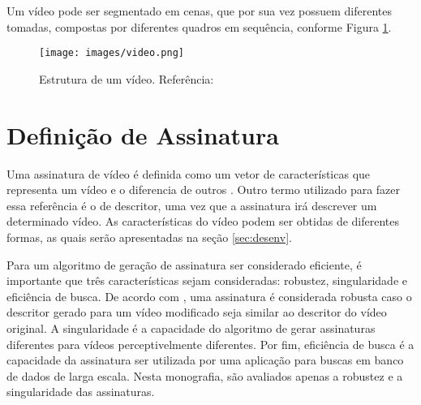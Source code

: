     
    Um vídeo pode ser segmentado em cenas, que por sua vez possuem diferentes tomadas, compostas por diferentes quadros em sequência, conforme Figura \ref{fig:video}. 
    
    
 
    
    \begin{figure}[h]
        \centering
        \texttt{[image: images/video.png]}
        \caption{Estrutura de um vídeo. Referência: \cite{santos2004segmentaccao}}
    	\label{fig:video}
    \end{figure}

  	\section{Definição de Assinatura}
    \label{sec:signature}
    
    	Uma assinatura de vídeo é definida como um vetor de características que representa um vídeo e o diferencia de outros \cite{lee2008robust}. Outro termo utilizado para fazer essa referência é o de descritor, uma vez que a assinatura irá descrever um determinado vídeo. As características do vídeo podem ser obtidas de diferentes formas, as quais serão apresentadas na seção \ref{sec:desenv}.
        
       Para um algoritmo de geração de assinatura ser considerado eficiente, é importante que três características sejam consideradas: robustez, singularidade e eficiência de busca. De acordo com \cite{lee2008robust}, uma assinatura é considerada robusta caso o descritor gerado para um vídeo modificado seja similar ao descritor do vídeo original. A singularidade é a capacidade do algoritmo de gerar assinaturas diferentes para vídeos perceptivelmente diferentes. Por fim, eficiência de busca é a capacidade da assinatura  ser utilizada por uma aplicação para buscas em banco de dados de larga escala. Nesta monografia, são avaliados apenas a robustez e a singularidade das assinaturas.
        
